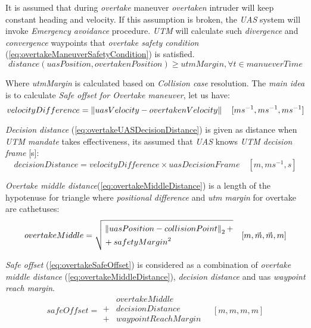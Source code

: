 It is assumed that during \emph{overtake} maneuver \emph{overtaken} intruder will keep constant heading and velocity. If this assumption is broken, the \emph{UAS} system will invoke \emph{Emergency avoidance} procedure. \emph{UTM} will calculate such \emph{divergence} and \emph{convergence} waypoints that \emph{overtake safety condition} (\ref{eq:overtakeManeuverSafetyCondition}) is satisfied.
\begin{equation}\label{eq:overtakeManeuverSafetyCondition}
        distance(uasPosition,overtakenPosition) \ge utmMargin, \forall t\in manueverTime
\end{equation}

\noindent Where \emph{utmMargin} is calculated based on \emph{Collision case} resolution.  The \emph{main idea} is to calculate \emph{Safe offset for Overtake maneuver}, let us have:
\begin{equation}\label{eq:overtakeVelocityDifference}
    velocityDifference=\left\lVert uasVelocity-overtakenVelocity\right\rVert\quad [ms^{-1},ms^{-1},ms^{-1}]
\end{equation}

\noindent \emph{Decision distance} (\ref{eq:overtakeUASDecisionDistance}) is given as distance when \emph{UTM mandate} takes effectiveness, its assumed that \emph{UAS} knows \emph{UTM decision frame} [s]:
\begin{equation}\label{eq:overtakeUASDecisionDistance}
    decisionDistance =  velocityDifference \times uasDecisionFrame\quad [m,ms^{-1},s]    
\end{equation}

\noindent \emph{Overtake middle distance}(\ref{eq:overtakeMiddleDistance}) is a length of the hypotenuse for triangle where \emph{positional difference} and \emph{utm margin} for overtake are cathetuses:
\begin{equation}\label{eq:overtakeMiddleDistance}
    overtakeMiddle=\sqrt{\begin{aligned}&\left\lVert uasPosition - collisionPoint\right\rVert_2+\\ &+ safetyMargin^2 \end{aligned}}\quad [m,\vec{m},\vec{m},m]
\end{equation}

\noindent \emph{Safe offset} (\ref{eq:overtakeSafeOffset}) is considered as a combination of \emph{overtake middle distance} (\ref{eq:overtakeMiddleDistance}), \emph{decision distance} and uas \emph{waypoint reach margin}.
\begin{equation}\label{eq:overtakeSafeOffset}
    safeOffset= \begin{aligned}
                    &  overtakeMiddle \\
                    +& decisionDistance \\
                    +& waypointReachMargin\\
                \end{aligned}
                \quad [m,m,m,m]
\end{equation}


